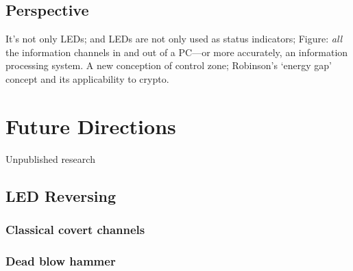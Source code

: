 \documentclass[a4paper,twoside]{book}
\begin{document}
\subsection{Perspective}
It's not only LEDs; and LEDs are not only used as status indicators; Figure:
\emph{all} the information channels in and out of a PC---or more accurately,
an information processing system. A new conception of control zone;
Robinson's `energy gap' concept and its applicability to crypto.
\section{Future Directions}
Unpublished research
\subsection{LED Reversing}
\subsubsection{Classical covert channels}
\subsubsection{Dead blow hammer}


\end{document}
